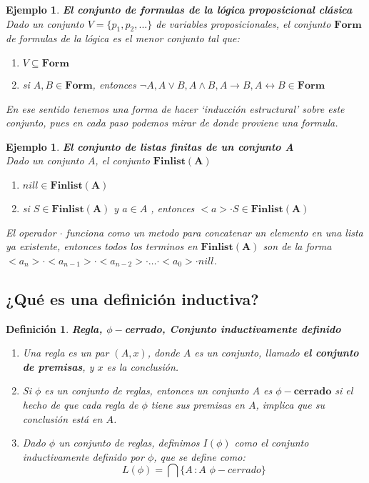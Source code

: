 \documentclass[executivepaper]{article}
\newtheorem{defi}[propo]{Definición}
\newtheorem{ejemplo}[propo]{Ejemplo}
\begin{document}
\begin{ejemplo}\textbf{El conjunto de formulas de la lógica proposicional clásica}\\
    Dado un conjunto $V = \{p_1, p_2,...\}$ de variables proposicionales, el conjunto $\mathbf{Form}$ de formulas de la lógica es el menor conjunto tal que:
    \begin{enumerate}
        \item $V \subseteq \mathbf{Form}$
        \item si $A, B \in \mathbf{Form}$, entonces $\neg A, A \lor B, A \land B, A \rightarrow B, A \leftrightarrow B \in \mathbf{Form}$
    \end{enumerate}
En ese sentido tenemos una forma de hacer \enquote*{inducción estructural} sobre este conjunto, pues en cada paso podemos mirar de donde proviene una formula.
\end{ejemplo}

\begin{ejemplo}\textbf{El conjunto de listas finitas de un conjunto A}\\
    Dado un conjunto $A$, el conjunto $\mathbf{Finlist(A)}$
    \begin{enumerate}
        \item $nill \in \mathbf{Finlist(A)}$
        \item si $S \in \mathbf{Finlist(A)}$ y $a \in A$ , entonces $<a>\cdot S\in \mathbf{Finlist(A)}$
    \end{enumerate}
El operador $\cdot$ funciona como un metodo para concatenar un elemento en una lista ya existente, entonces todos los terminos en $\mathbf{Finlist(A)}$ son de la forma $<a_n>\cdot<a_{n-1}>\cdot<a_{n-2}>\cdot\ldots\cdot<a_{0}>\cdot nill$.
\end{ejemplo}

\subsection{¿Qué es una definición inductiva?}
\begin{defi}
\textbf{Regla, $\phi-$cerrado, Conjunto inductivamente definido}
\begin{enumerate}
\item Una regla es un par $(A,x)$, donde $A$ es un conjunto, llamado \textbf{el conjunto de premisas}, y $x$ es la conclusión.
\item Si $\phi$ es un conjunto de reglas, entonces un conjunto $A$ es $\phi - \textbf{cerrado}$ si el hecho de que cada regla de $\phi$ tiene sus premisas en $A$, implica que su conclusión está en $A$.
\item Dado $\phi$ un conjunto de reglas, definimos $I(\phi)$ como el conjunto inductivamente definido por $\phi$, que se define como:
$$L(\phi) = \bigcap\{A \, : A\,\, \phi-cerrado\}$$
\end{enumerate}
\end{defi}
\end{document}
